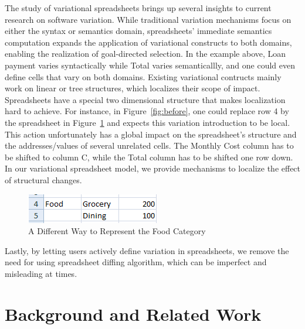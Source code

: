\documentclass[conference]{IEEEtran}
\newcommand{\figscale}{0.6}
\newcommand{\varsheet}{VarSheet}
\newcommand{\EUSES}{EUSES}
\newcommand{\gds}{goal-directed selection}
\begin{document}
The study of variational spreadsheets brings up several insights to 
current research on software variation. While traditional variation 
mechanisms focus on either the syntax or semantics domain, spreadsheets' 
immediate semantics computation expands the application of variational 
constructs to both domains, enabling the realization of \gds. In the 
example above, Loan payment varies syntactically while Total varies 
semanticallly, and one could even define cells that vary on both 
domains. 
%
Existing variational contructs mainly work on linear or tree structures, 
which localizes their scope of impact. Spreadsheets have a special two 
dimensional structure that makes localization hard to achieve. For 
instance, in Figure~\ref{fig:before}, one could replace row 4 by the 
spreadsheet in Figure~\ref{fig:food} and expects this variation 
introduction to be local. This action unfortunately has a global impact 
on the spreadsheet's structure and the addresses/values of several 
unrelated cells. The Monthly Cost column has to be shifted to column C, 
while the Total column has to be shifted one row down. In our 
variational spreadsheet model, we provide mechanisms to localize the 
effect of structural changes. 

\begin{figure}
\centering
\includegraphics[scale=\figscale]{img/food}
\caption{A Different Way to Represent the Food Category}
\label{fig:food}
\end{figure}

Lastly, by letting users actively define variation in spreadsheets, we 
remove the need for using spreadsheet diffing algorithm, which can be 
imperfect and misleading at times. 


\section{Background and Related Work}
\label{sec:background}
\end{document}
